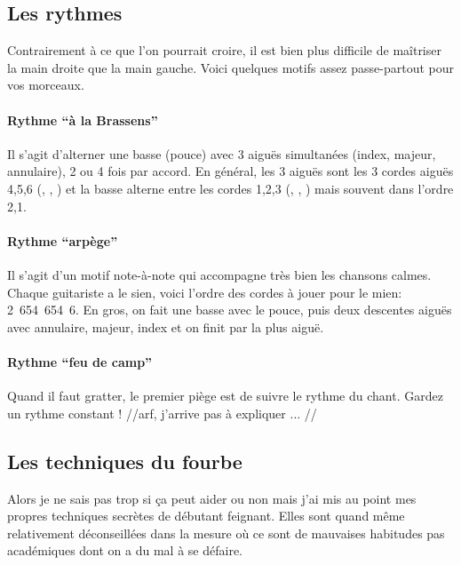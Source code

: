 \documentclass[versionenligne]{patacrep}
\begin{document}
\subsection{Les rythmes}

Contrairement à ce que l'on pourrait croire, il est bien plus
difficile de maîtriser la main droite que la main gauche.
Voici quelques motifs assez passe-partout pour vos morceaux.

\paragraph{Rythme ``à la Brassens''} Il s'agit d'alterner une basse (pouce)
avec 3 aiguës simultanées (index, majeur, annulaire), 2 ou 4 fois par
accord. En général, les 3 aiguës sont les 3 cordes aiguës 4,5,6
(, , ) et la basse alterne entre
les cordes 1,2,3 (, , ) mais
souvent dans l'ordre 2,1.

\paragraph{Rythme ``arpège''} Il s'agit d'un motif note-à-note qui
accompagne très bien les chansons calmes. Chaque guitariste a le
sien, voici l'ordre des cordes à jouer pour le mien: 2~654~654~6. En
gros, on fait une basse avec le pouce, puis deux descentes aiguës avec
annulaire, majeur, index et on finit par la plus aiguë.

\paragraph{Rythme ``feu de camp''} Quand il faut gratter, le premier
piège est de suivre le rythme du chant. Gardez un rythme constant !
//arf, j'arrive pas à expliquer ... //


\subsection{Les techniques du fourbe}

Alors je ne sais pas trop si ça peut aider ou non mais j'ai mis au
point mes propres techniques secrètes de débutant feignant. Elles sont
quand même relativement déconseillées dans la mesure où ce sont de
mauvaises habitudes pas académiques dont on a du mal à se défaire.
\end{document}
